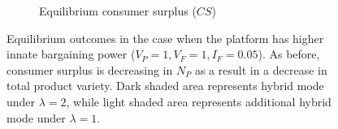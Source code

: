\documentclass[a4paper]{article}
\begin{document}
\begin{figure}
\begin{subfigure}[b]{0.45\textwidth}
        \caption{Equilibrium consumer surplus ($CS$)}
    \end{subfigure}
    \caption{Equilibrium outcomes in the case when the platform has higher innate bargaining power ($V_P = 1, V_F = 1, I_F = 0.05$). As before, consumer surplus is decreasing in $N_P$ as a result in a decrease in total product variety. Dark shaded area represents hybrid mode under $\lambda=2$, while light shaded area represents additional hybrid mode under $\lambda=1$.}
    \label{fig:equilibrium_high_lambda}
\end{figure}
\end{document}
